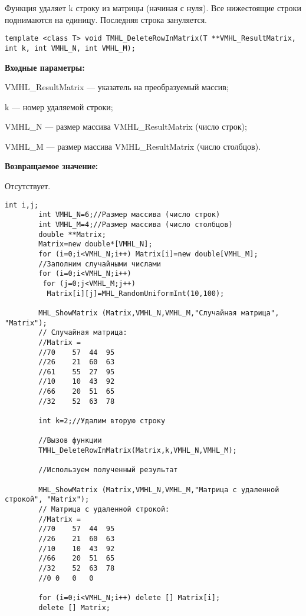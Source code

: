 \documentclass[a4paper,12pt]{article}
\begin{document}
Функция удаляет k строку из матрицы (начиная с нуля). Все нижестоящие строки поднимаются на единицу. Последняя строка зануляется.


\begin{lstlisting}[label=code_syntax_TMHL_DeleteRowInMatrix,caption=Синтаксис]
template <class T> void TMHL_DeleteRowInMatrix(T **VMHL_ResultMatrix, int k, int VMHL_N, int VMHL_M);
\end{lstlisting}

\textbf{Входные параметры:}  
 
VMHL\_ResultMatrix --- указатель на преобразуемый массив;
 
k --- номер удаляемой строки;
 
VMHL\_N --- размер массива VMHL\_ResultMatrix (число строк);
 
VMHL\_M --- размер массива VMHL\_ResultMatrix (число столбцов).

\textbf{Возвращаемое значение:}

Отсутствует.


\begin{lstlisting}[label=code_use_TMHL_DeleteRowInMatrix,caption=Пример использования]
        int i,j;
        int VMHL_N=6;//Размер массива (число строк)
        int VMHL_M=4;//Размер массива (число столбцов)
        double **Matrix;
        Matrix=new double*[VMHL_N];
        for (i=0;i<VMHL_N;i++) Matrix[i]=new double[VMHL_M];
        //Заполним случайными числами
        for (i=0;i<VMHL_N;i++)
         for (j=0;j<VMHL_M;j++)
          Matrix[i][j]=MHL_RandomUniformInt(10,100);

        MHL_ShowMatrix (Matrix,VMHL_N,VMHL_M,"Случайная матрица", "Matrix");
        // Случайная матрица:
        //Matrix =
        //70	57	44	95
        //26	21	60	63
        //61	55	27	95
        //10	10	43	92
        //66	20	51	65
        //32	52	63	78

        int k=2;//Удалим вторую строку

        //Вызов функции
        TMHL_DeleteRowInMatrix(Matrix,k,VMHL_N,VMHL_M);

        //Используем полученный результат

        MHL_ShowMatrix (Matrix,VMHL_N,VMHL_M,"Матрица с удаленной строкой", "Matrix");
        // Матрица с удаленной строкой:
        //Matrix =
        //70	57	44	95
        //26	21	60	63
        //10	10	43	92
        //66	20	51	65
        //32	52	63	78
        //0	0	0	0

        for (i=0;i<VMHL_N;i++) delete [] Matrix[i];
        delete [] Matrix;
\end{lstlisting}
\end{document}
